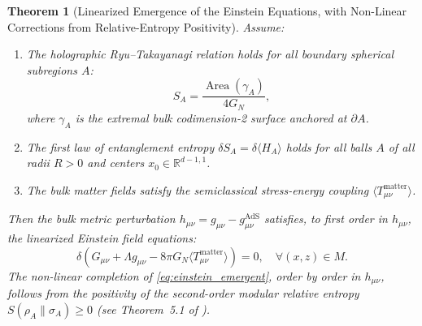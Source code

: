 \documentclass[11pt,a4paper,reqno]{amsart}
\newtheorem{theorem}{Theorem}[section]
\theoremstyle{definition}
\numberwithin{equation}{section}
\providecommand{\R}{\mathbb{R}}
\providecommand{\Area}{\operatorname{Area}}
\begin{document}
\begin{theorem}[Linearized Emergence of the Einstein Equations, with Non-Linear Corrections from Relative-Entropy Positivity]
\label{thm:einstein_emergence}
Assume:
\begin{enumerate}[label=(\alph*)]
    \item The holographic Ryu--Takayanagi relation holds for all boundary spherical subregions $A$:
    \begin{equation}
        S_A = \frac{\Area(\gamma_A)}{4 G_N},
    \end{equation}
    where $\gamma_A$ is the extremal bulk codimension-2 surface anchored at $\partial A$.
    \item The first law of entanglement entropy $\delta S_A = \delta \langle H_A \rangle$ holds for all balls $A$ of all radii $R > 0$ and centers $x_0 \in \R^{d-1, 1}$.
    \item The bulk matter fields satisfy the semiclassical stress-energy coupling $\langle T_{\mu\nu}^{\mathrm{matter}} \rangle$.
\end{enumerate}
Then the bulk metric perturbation $h_{\mu\nu} = g_{\mu\nu} - g_{\mu\nu}^{\mathrm{AdS}}$ satisfies, to first order in $h_{\mu\nu}$, the linearized Einstein field equations:
\begin{equation}
    \label{eq:einstein_emergent}
    \delta\!\left(G_{\mu\nu} + \Lambda g_{\mu\nu} - 8\pi G_N \langle T_{\mu\nu}^{\mathrm{matter}} \rangle\right) = 0, \quad \forall (x, z) \in M.
\end{equation}
The non-linear completion of \eqref{eq:einstein_emergent}, order by order in $h_{\mu\nu}$, follows from the positivity of the second-order modular relative entropy $S(\rho_A\|\sigma_A) \ge 0$ (see Theorem~5.1 of \cite{silvafilho2026grand}).
\end{theorem}
\end{document}
